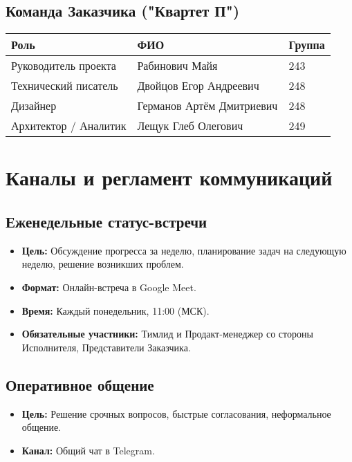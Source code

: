 \documentclass[12pt,a4paper]{article}
\begin{document}
\subsection{Команда Заказчика ("Квартет П")}

\begin{table}[h]
\centering
\begin{tabular}{|p{3cm}|p{4cm}|p{1.5cm}|}
\hline
\textbf{Роль} & \textbf{ФИО} & \textbf{Группа} \\
\hline
Руководитель проекта & Рабинович Майя & 243 \\
\hline
Технический писатель & Двойцов Егор Андреевич & 248 \\
\hline
Дизайнер & Германов Артём Дмитриевич & 248 \\
\hline
Архитектор / Аналитик & Лещук Глеб Олегович & 249 \\
\hline
\end{tabular}
\end{table}

\section{Каналы и регламент коммуникаций}

\subsection{Еженедельные статус-встречи}
\begin{itemize}
    \item \textbf{Цель:} Обсуждение прогресса за неделю, планирование задач на следующую неделю, решение возникших проблем.
    \item \textbf{Формат:} Онлайн-встреча в Google Meet.
    \item \textbf{Время:} Каждый понедельник, 11:00 (МСК).
    \item \textbf{Обязательные участники:} Тимлид и Продакт-менеджер со стороны Исполнителя, Представители Заказчика.
\end{itemize}

\subsection{Оперативное общение}
\begin{itemize}
    \item \textbf{Цель:} Решение срочных вопросов, быстрые согласования, неформальное общение.
    \item \textbf{Канал:} Общий чат в Telegram.
\end{itemize}
\end{document}
